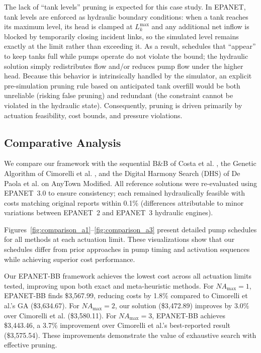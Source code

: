 \documentclass[a4paper,fleqn]{cas-dc}
\begin{document}
The lack of ``tank levels'' pruning is expected for this case study. In EPANET, tank levels are enforced as hydraulic boundary conditions: when a tank reaches its maximum level, its head is clamped at $L_k^{\max}$ and any additional net inflow is blocked by temporarily closing incident links, so the simulated level remains exactly at the limit rather than exceeding it. As a result, schedules that ``appear'' to keep tanks full while pumps operate do not violate the bound; the hydraulic solution simply redistributes flow and/or reduces pump flow under the higher head. Because this behavior is intrinsically handled by the simulator, an explicit pre-simulation pruning rule based on anticipated tank overfill would be both unreliable (risking false pruning) and redundant (the constraint cannot be violated in the hydraulic state). Consequently, pruning is driven primarily by actuation feasibility, cost bounds, and pressure violations.

\subsection{Comparative Analysis}

We compare our framework with the sequential B\&B of Costa et al. \cite{Costa2016}, the Genetic Algorithm of Cimorelli et al. \cite{Cimorelli2020}, and the Digital Harmony Search (DHS) of De Paola et al. \cite{Paola2024} on AnyTown Modified. All reference solutions were re-evaluated using EPANET~3.0 to ensure consistency; each remained hydraulically feasible with costs matching original reports within 0.1\% (differences attributable to minor variations between EPANET~2 and EPANET~3 hydraulic engines).

Figures~\ref{fig:comparison_a1}--\ref{fig:comparison_a3} present detailed pump schedules for all methods at each actuation limit. These visualizations show that our schedules differ from prior approaches in pump timing and activation sequences while achieving superior cost performance.

Our EPANET-BB framework achieves the lowest cost across all actuation limits tested, improving upon both exact and meta-heuristic methods. For $NA_{\max}=1$, EPANET-BB finds \$3,567.99, reducing costs by 1.8\% compared to Cimorelli et al.'s GA (\$3,634.67). For $NA_{\max}=2$, our solution (\$3,472.89) improves by 3.0\% over Cimorelli et al. (\$3,580.11). For $NA_{\max}=3$, EPANET-BB achieves \$3,443.46, a 3.7\% improvement over Cimorelli et al.'s best-reported result (\$3,575.54). These improvements demonstrate the value of exhaustive search with effective pruning.
\end{document}

